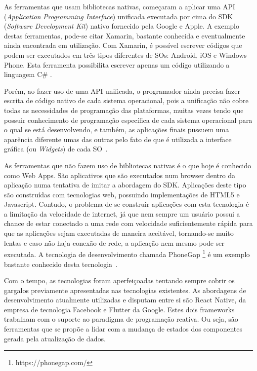 As ferramentas que usam bibliotecas nativas, começaram a aplicar uma API (\textit{Application Programming Interface}) unificada executada por cima do SDK (\textit{Software Development Kit}) nativo fornecido pela Google e Apple.
A exemplo destas ferramentas, pode-se citar Xamarin, bastante conhecida e eventualmente ainda encontrada em utilização.
Com Xamarin, é possível escrever códigos que podem ser executados em três tipos diferentes de SOs: Android, iOS e Windows Phone.
Esta ferramenta possibilita escrever apenas um código utilizando a linguagem C\# \cite{petzold2015xamarin}.

Porém, ao fazer uso de uma API unificada, o programador ainda precisa fazer escrita de código nativo de cada sistema operacional, pois a unificação não cobre todas as necessidades de programação das plataformas, muitas vezes tendo que possuir conhecimento de programação específica de cada sistema operacional para o qual se está desenvolvendo, e também, as aplicações finais pussuem uma aparência diferente umas das outras pelo fato de que é utilizada a interface gráfica (ou \textit{Widgets}) de cada SO~\cite{clow2019flutter}.

As ferramentas que não fazem uso de bibliotecas nativas é o que hoje é conhecido como Web Apps.
São aplicativos que são executados num browser dentro da aplicação numa tentativa de imitar a abordagem do SDK. Aplicações deste tipo são construídas com tecnologias web, possuindo implementações de HTML5 e Javascript.
Contudo, o problema de se construir aplicações com esta tecnologia é a limitação da velocidade de internet, já que nem sempre um usuário possui a chance de estar conectado a uma rede com velocidade suficientemente rápida para que as aplicações sejam executadas de maneira aceitável, tornando-se muito lentas e caso não haja conexão de rede, a aplicação nem mesmo pode ser executada.
A tecnologia de desenvolvimento chamada PhoneGap \footnote{https://phonegap.com/} é um exemplo bastante conhecido desta tecnologia~\cite{clow2019flutter}.

Com o tempo, as tecnologias foram aperfeiçoadas tentando sempre cobrir os gargalos previamente apresentadas nas tecnologias existentes.
As abordagens de desenvolvimento atualmente utilizadas e disputam entre si são React Native, da empresa de tecnologia Facebook e Flutter da Google.
Estes dois frameworks trabalham com o suporte ao paradigma de programação reativa.
Ou seja, são ferramentas que se propõe a lidar com a mudança de estados dos componentes gerada pela atualização de dados\cite{lima2019avaliacao}.


